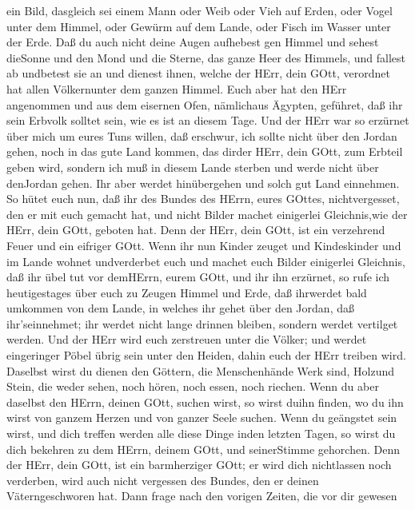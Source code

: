 ein Bild, dasgleich sei einem Mann oder Weib  oder Vieh auf
Erden, oder Vogel unter dem Himmel,  oder Gewürm auf dem
Lande, oder Fisch im Wasser unter der Erde.  Daß du auch
nicht deine Augen aufhebest gen Himmel und sehest dieSonne und den Mond
und die Sterne, das ganze Heer des Himmels, und fallest ab undbetest sie
an und dienest ihnen, welche der HErr, dein GOtt, verordnet hat allen
Völkernunter dem ganzen Himmel.  Euch aber hat den HErr
angenommen und aus dem eisernen Ofen, nämlichaus Ägypten, geführet, daß
ihr sein Erbvolk solltet sein, wie es ist an diesem Tage. 
Und der HErr war so erzürnet über mich um eures Tuns willen, daß
erschwur, ich sollte nicht über den Jordan gehen, noch in das gute Land
kommen, das dirder HErr, dein GOtt, zum Erbteil geben wird,
 sondern ich muß in diesem Lande sterben und werde nicht
über denJordan gehen. Ihr aber werdet hinübergehen und solch gut Land
einnehmen.  So hütet euch nun, daß ihr des Bundes des
HErrn, eures GOttes, nichtvergesset, den er mit euch gemacht hat, und
nicht Bilder machet einigerlei Gleichnis,wie der HErr, dein GOtt,
geboten hat.  Denn der HErr, dein GOtt, ist ein verzehrend
Feuer und ein eifriger GOtt.  Wenn ihr nun Kinder zeuget
und Kindeskinder und im Lande wohnet undverderbet euch und machet euch
Bilder einigerlei Gleichnis, daß ihr übel tut vor demHErrn, eurem GOtt,
und ihr ihn erzürnet,  so rufe ich heutigestages über euch
zu Zeugen Himmel und Erde, daß ihrwerdet bald umkommen von dem Lande, in
welches ihr gehet über den Jordan, daß ihr'seinnehmet; ihr werdet nicht
lange drinnen bleiben, sondern werdet vertilget werden. 
Und der HErr wird euch zerstreuen unter die Völker; und werdet
eingeringer Pöbel übrig sein unter den Heiden, dahin euch der HErr
treiben wird.  Daselbst wirst du dienen den Göttern, die
Menschenhände Werk sind, Holzund Stein, die weder sehen, noch hören,
noch essen, noch riechen.  Wenn du aber daselbst den HErrn,
deinen GOtt, suchen wirst, so wirst duihn finden, wo du ihn wirst von
ganzem Herzen und von ganzer Seele suchen.  Wenn du
geängstet sein wirst, und dich treffen werden alle diese Dinge inden
letzten Tagen, so wirst du dich bekehren zu dem HErrn, deinem GOtt, und
seinerStimme gehorchen.  Denn der HErr, dein GOtt, ist ein
barmherziger GOtt; er wird dich nichtlassen noch verderben, wird auch
nicht vergessen des Bundes, den er deinen Väterngeschworen hat.
 Dann frage nach den vorigen Zeiten, die vor dir gewesen
